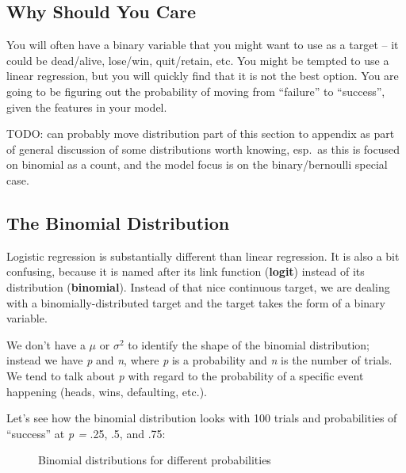 \documentclass[
  letterpaper,
]{krantz}
\begin{document}
\subsection{Why Should You Care}\label{sec-glm-logistic-why}

You will often have a binary variable that you might want to use as a
target -- it could be dead/alive, lose/win, quit/retain, etc. You might
be tempted to use a linear regression, but you will quickly find that it
is not the best option. You are going to be figuring out the probability
of moving from ``failure'' to ``success'', given the features in your
model.

TODO: can probably move distribution part of this section to appendix as
part of general discussion of some distributions worth knowing, esp.~as
this is focused on binomial as a count, and the model focus is on the
binary/bernoulli special case.

\subsection{The Binomial Distribution}\label{sec-glm-binomial}

Logistic regression is substantially different than linear regression.
It is also a bit confusing, because it is named after its link function
(\textbf{logit}) instead of its distribution (\textbf{binomial}).
Instead of that nice continuous target, we are dealing with a
binomially-distributed target and the target takes the form of a binary
variable.

We don't have a \(\mu\) or \(\sigma^2\) to identify the shape of the
binomial distribution; instead we have \emph{p} and \emph{n}, where
\emph{p} is a probability and \emph{n} is the number of trials. We tend
to talk about \emph{p} with regard to the probability of a specific
event happening (heads, wins, defaulting, etc.).

Let's see how the binomial distribution looks with 100 trials and
probabilities of ``success'' at \emph{p = } .25, .5, and .75:

\begin{figure}[H]


\caption{\label{fig-binomial}Binomial distributions for different
probabilities}

\end{figure}%
\end{document}

